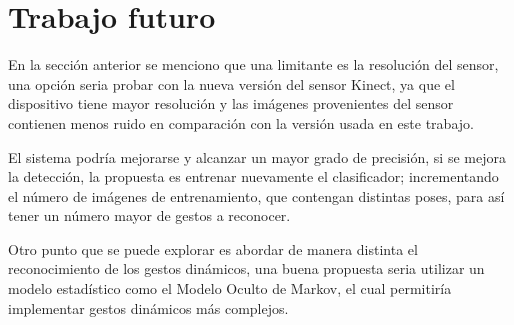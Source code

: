 

\section{Trabajo futuro}\label{futureWork}  

En la sección anterior se menciono que una limitante es la resolución del sensor, una opción seria probar con la nueva versión del sensor Kinect, ya que el dispositivo tiene mayor resolución y las imágenes provenientes del sensor contienen menos ruido en comparación con la versión usada en este trabajo. 

El sistema podría mejorarse y alcanzar un mayor grado de precisión, si se mejora la detección, la propuesta es entrenar nuevamente el clasificador; incrementando el número de imágenes de entrenamiento, que contengan distintas poses, para así tener un número mayor de gestos a reconocer.

Otro punto que se puede explorar es abordar de manera distinta el reconocimiento de los gestos dinámicos, una buena propuesta seria utilizar un modelo estadístico como el Modelo Oculto de Markov, el cual permitiría implementar gestos dinámicos más complejos.  

\newpage
